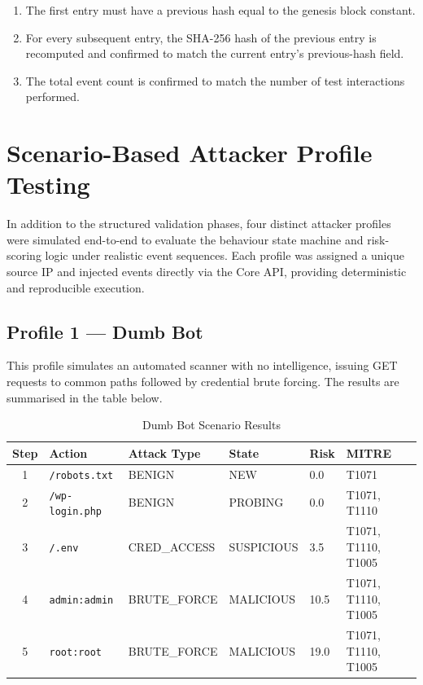 \begin{enumerate}
    \item The first entry must have a previous hash equal to the genesis block constant.
    \item For every subsequent entry, the SHA-256 hash of the previous entry is recomputed and confirmed to match the current entry's previous-hash field.
    \item The total event count is confirmed to match the number of test interactions performed.
\end{enumerate}

\section{Scenario-Based Attacker Profile Testing}

In addition to the structured validation phases, four distinct attacker profiles were simulated end-to-end to evaluate the behaviour state machine and risk-scoring logic under realistic event sequences. Each profile was assigned a unique source IP and injected events directly via the Core API, providing deterministic and reproducible execution.

\subsection{Profile 1 — Dumb Bot}

This profile simulates an automated scanner with no intelligence, issuing GET requests to common paths followed by credential brute forcing. The results are summarised in the table below.

\begin{table}[h!]
    \centering
    \caption{Dumb Bot Scenario Results}
    \renewcommand{\arraystretch}{1.3}
    \begin{tabular}{|c|l|l|l|l|l|}
        \hline
        \textbf{Step} & \textbf{Action} & \textbf{Attack Type} & \textbf{State} & \textbf{Risk} & \textbf{MITRE} \\
        \hline
        1 & \texttt{/robots.txt} & BENIGN & NEW & 0.0 & T1071 \\
        2 & \texttt{/wp-login.php} & BENIGN & PROBING & 0.0 & T1071, T1110 \\
        3 & \texttt{/.env} & CRED\_ACCESS & SUSPICIOUS & 3.5 & T1071, T1110, T1005 \\
        4 & \texttt{admin:admin} & BRUTE\_FORCE & MALICIOUS & 10.5 & T1071, T1110, T1005 \\
        5 & \texttt{root:root} & BRUTE\_FORCE & MALICIOUS & 19.0 & T1071, T1110, T1005 \\
        \hline
    \end{tabular}
\end{table}

